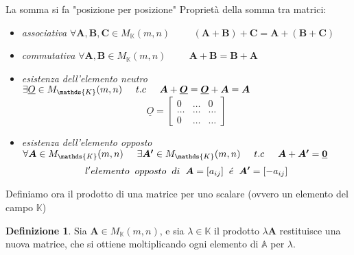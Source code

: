 \documentclass[a4paper, 12pt]{article}
\theoremstyle{definition}
\newtheorem{defn}[thm]{Definizione}
\begin{document}
\noindent La somma si fa "posizione per posizione"
\newpage
\noindent Proprietà della somma tra matrici:
\begin{itemize}
    \item \textit{associativa} \hspace{1.5cm} $\forall{\boldsymbol{A,B,C}} \in  M_\mathds{K}(m, n) \hspace{1cm }(\boldsymbol{A + B}) + \boldsymbol{C} = \boldsymbol{A} + (\boldsymbol{B} + \boldsymbol{C})$
    \item \textit{commutativa} \hspace{1.5cm} $\forall{\boldsymbol{A, B}} \in  M_\mathds{K}(m, n) \hspace{1cm} \boldsymbol{A + B = B + A} $
    \item \textit{esistenza dell'elemento neutro} $\exists \underline{O} \in  M_\mathds{K}(m, n)\hspace{0.5cm}t.c\hspace{0.5cm} \boldsymbol{A} + \boldsymbol{\underline{O}} = \boldsymbol{\underline{O}} + \boldsymbol{A} = \boldsymbol{A} $
    \[
    \underline{O} = \begin{bmatrix}
        0 & \dots & 0 \\
        \dots & \dots & \dots \\
        0 & \dots & \dots
    \end{bmatrix}
    \]
    \item \textit{esistenza dell'elemento opposto} $\forall{\boldsymbol{A}} \in M_\mathds{K}(m, n) \hspace{0.5cm} \exists{\boldsymbol{A'}} \in M_\mathds{K}(m, n) \hspace{0.5cm} t.c \hspace{0.5cm} \boldsymbol{A} + \boldsymbol{A'} = \boldsymbol{\underline{0}} $
    \[ l'elemento\hspace{0.2cm} opposto \hspace{0.2cm} di \hspace{0.2cm} \boldsymbol{A} = [a_{ij}] \hspace{0.2cm} \acute{e} \hspace{0.2cm} \boldsymbol{A'} = [-a_{ij}] \]
\end{itemize}
\noindent Definiamo ora il prodotto di una matrice per uno scalare (ovvero un elemento del campo $\mathds{K}$)
\begin{defn}
    Sia $\mathbf{A} \in  M_\mathds{K}(m, n)$, e sia $\lambda \in \mathds{K}$ il prodotto  $\lambda\mathbf{A}$ restituisce una nuova matrice, che si ottiene moltiplicando ogni elemento di $\mathds{A}$ per $\lambda$.
\end{defn}
\end{document}
